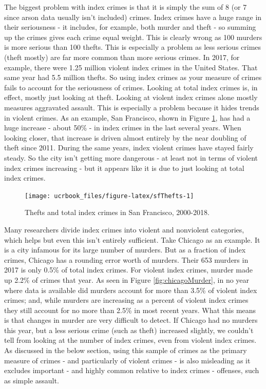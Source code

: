 \documentclass[
  12pt,
  openany]{book}
\begin{document}
The biggest problem with index crimes is that it is simply the sum of 8 (or 7 since arson data usually isn't included) crimes. Index crimes have a huge range in their seriousness - it includes, for example, both murder and theft - so summing up the crimes gives each crime equal weight. This is clearly wrong as 100 murders is more serious than 100 thefts. This is especially a problem as less serious crimes (theft mostly) are far more common than more serious crimes. In 2017, for example, there were 1.25 million violent index crimes in the United States. That same year had 5.5 million thefts. So using index crimes as your measure of crimes fails to account for the seriousness of crimes. Looking at total index crimes is, in effect, mostly just looking at theft. Looking at violent index crimes alone mostly measures aggravated assault. This is especially a problem because it hides trends in violent crimes. As an example, San Francisco, shown in Figure \ref{fig:sfThefts}, has had a huge increase - about 50\% - in index crimes in the last several years. When looking closer, that increase is driven almost entirely by the near doubling of theft since 2011. During the same years, index violent crimes have stayed fairly steady. So the city isn't getting more dangerous - at least not in terms of violent index crimes increasing - but it appears like it is due to just looking at total index crimes.

\begin{figure}

{\centering \texttt{[image: ucrbook\_files/figure-latex/sfThefts-1]} 

}

\caption{Thefts and total index crimes in San Francisco, 2000-2018.}\label{fig:sfThefts}
\end{figure}

Many researchers divide index crimes into violent and nonviolent categories, which helps but even this isn't entirely sufficient. Take Chicago as an example. It is a city infamous for its large number of murders. But as a fraction of index crimes, Chicago has a rounding error worth of murders. Their 653 murders in 2017 is only 0.5\% of total index crimes. For violent index crimes, murder made up 2.2\% of crimes that year. As seen in Figure \ref{fig:chicagoMurder}, in no year where data is available did murders account for more than 3.5\% of violent index crimes; and, while murders are increasing as a percent of violent index crimes they still account for no more than 2.5\% in most recent years. What this means is that changes in murder are very difficult to detect. If Chicago had no murders this year, but a less serious crime (such as theft) increased slightly, we couldn't tell from looking at the number of index crimes, even from violent index crimes. As discussed in the below section, using this sample of crimes as the primary measure of crimes - and particularly of violent crimes - is also misleading as it excludes important - and highly common relative to index crimes - offenses, such as simple assault.
\end{document}
